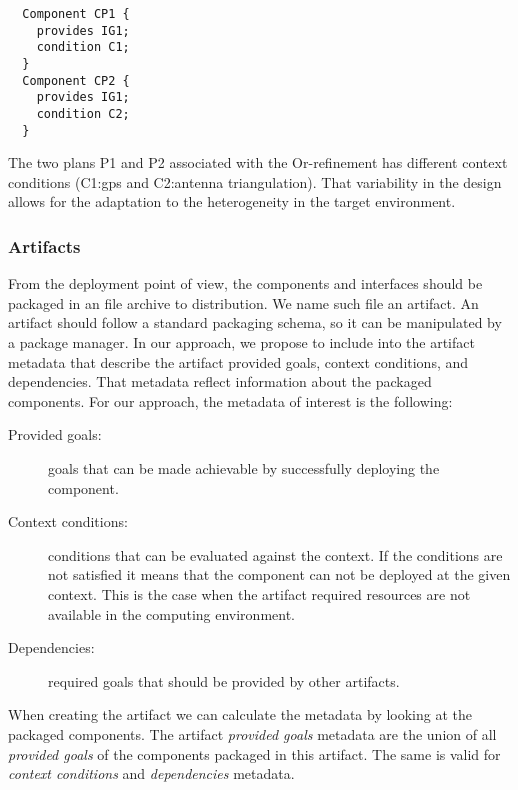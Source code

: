 \begin{lstlisting}
  Component CP1 {
    provides IG1;
    condition C1;
  }
  Component CP2 {
    provides IG1;
    condition C2;
  }
\end{lstlisting}

The two plans P1 and P2 associated with the Or-refinement has different context conditions (C1:gps and C2:antenna triangulation).
That variability in the design allows for the adaptation to the heterogeneity in the target environment.

\subsubsection{Artifacts}
\label{sec_artifacts}

From the deployment point of view, the components and interfaces should be packaged in an file archive to distribution. We name such file an artifact.
An artifact should follow a standard packaging schema, so it can be manipulated by a package manager.
In our approach, we propose to include into the artifact metadata that describe the artifact provided goals, context conditions, and dependencies. That metadata reflect information about the packaged components. For our approach, the metadata of interest is the following:

\begin{description}
  \item[Provided goals:] goals that can be made achievable by successfully deploying the component.
  \item[Context conditions:] conditions that can be evaluated against the context. If the conditions are not satisfied it means that the component can not be deployed at the given context. This is the case when the artifact required resources are not available in the computing environment.
  \item[Dependencies:] required goals that should be provided by other artifacts.
\end{description}

When creating the artifact we can calculate the metadata by looking at the packaged components. The artifact \emph{provided goals} metadata are the union of all \emph{provided goals} of the components packaged in this artifact. The same is valid for \emph{context conditions} and \emph{dependencies} metadata.

